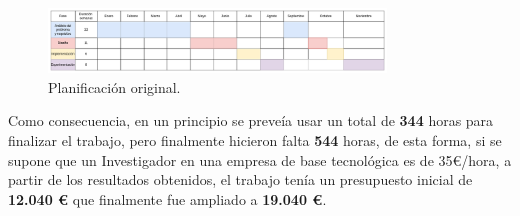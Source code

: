     \begin{figure}[!h]
        \centering
        \includegraphics[width=0.8\textwidth]{img/plan_definitivo.png}
        \caption{Planificación original.}
        \label{Fig::Planificacion final}
    \end{figure}

    \medskip

    \noindent Como consecuencia, en un principio se preveía usar un total de \textbf{344} horas para finalizar el trabajo, pero finalmente hicieron falta \textbf{544} horas, de esta forma, si se supone que un Investigador en una empresa de base tecnológica es de 35€/hora, a partir de los resultados obtenidos, el trabajo tenía un presupuesto inicial de \textbf{12.040 €} que finalmente fue ampliado a \textbf{19.040 €}.
    
\endinput


